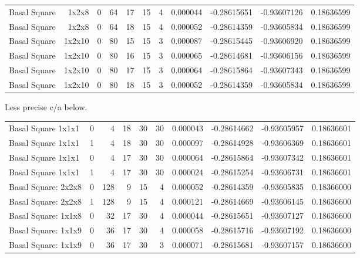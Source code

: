 \documentclass[11pt]{article}
\begin{document}
\begin{center}
\begin{tabular}{lrrrrrrrrrr}
Basal Square & 1x2x8 & 0 & 64 & 17 & 15 & 4 & 0.000044 & -0.28615651 & -0.93607126 & 0.18636599\\
Basal Square & 1x2x8 & 0 & 64 & 18 & 15 & 4 & 0.000052 & -0.28614359 & -0.93605834 & 0.18636599\\
Basal Square & 1x2x10 & 0 & 80 & 15 & 15 & 3 & 0.000087 & -0.28615445 & -0.93606920 & 0.18636599\\
Basal Square & 1x2x10 & 0 & 80 & 16 & 15 & 3 & 0.000065 & -0.28614681 & -0.93606156 & 0.18636599\\
Basal Square & 1x2x10 & 0 & 80 & 17 & 15 & 3 & 0.000064 & -0.28615864 & -0.93607343 & 0.18636599\\
Basal Square & 1x2x10 & 0 & 80 & 18 & 15 & 3 & 0.000052 & -0.28614359 & -0.93605834 & 0.18636599\\
\end{tabular}
\end{center}
Less precise c/a below. 
\begin{center}
\begin{tabular}{lrrrrrrrrr}
\hline
Basal Square  1x1x1 & 0 & 4 & 18 & 30 & 30 & 0.000043 & -0.28614662 & -0.93605957 & 0.18636601\\
Basal Square  1x1x1 & 1 & 4 & 18 & 30 & 30 & 0.000097 & -0.28614928 & -0.93606369 & 0.18636601\\
Basal Square  1x1x1 & 0 & 4 & 17 & 30 & 30 & 0.000064 & -0.28615864 & -0.93607342 & 0.18636601\\
Basal Square  1x1x1 & 1 & 4 & 17 & 30 & 30 & 0.000024 & -0.28615254 & -0.93606731 & 0.18636601\\
Basal Square: 2x2x8 & 0 & 128 & 9 & 15 & 4 & 0.000052 & -0.28614359 & -0.93605835 & 0.18366000\\
Basal Square: 2x2x8 & 1 & 128 & 9 & 15 & 4 & 0.000121 & -0.28614669 & -0.93606145 & 0.18636600\\
Basal Square: 1x1x8 & 0 & 32 & 17 & 30 & 4 & 0.000044 & -0.28615651 & -0.93607127 & 0.18636600\\
Basal Square: 1x1x9 & 0 & 36 & 17 & 30 & 4 & 0.000058 & -0.28615716 & -0.93607192 & 0.18636600\\
Basal Square: 1x1x9 & 0 & 36 & 17 & 30 & 3 & 0.000071 & -0.28615681 & -0.93607157 & 0.18636600\\
\end{tabular}
\end{center}
\end{document}
